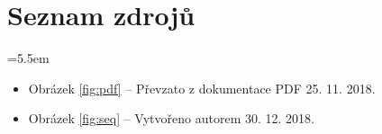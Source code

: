 \appendix

\chapter{Seznam zdrojů}

\medskip
\bgroup \leftskip=5.5em

\begin{itemize}
	
	\item Obrázek \ref{fig:pdf} -- Převzato z dokumentace PDF\cite{pdf} 25. 11. 2018.
	\item Obrázek \ref{fig:seq} -- Vytvořeno autorem 30. 12. 2018.
	
\end{itemize}

\par\egroup